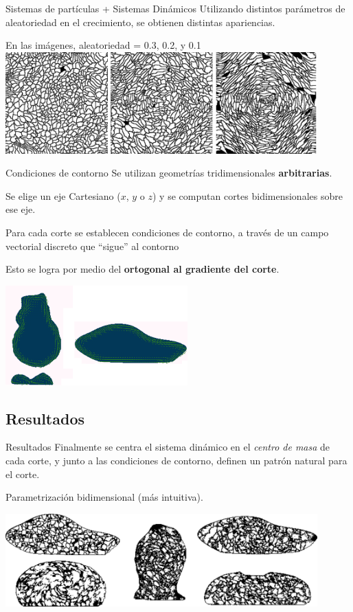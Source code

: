 \documentclass[spanish]{beamer}
\begin{document}
\begin{frame}{Sistemas de partículas + Sistemas Dinámicos}
Utilizando distintos parámetros de aleatoriedad en el crecimiento, se obtienen distintas apariencias.

En las imágenes, aleatoriedad = 0.3, 0.2, y 0.1
  \includegraphics[width=12cm]{../figures/Fig3}
\end{frame}

\begin{frame}{Condiciones de contorno}
Se utilizan geometrías tridimensionales \textbf{arbitrarias}.

Se elige un eje Cartesiano ($x$, $y$ o $z$) y se computan cortes bidimensionales sobre ese eje.

Para cada corte se establecen condiciones de contorno, a través de un campo vectorial discreto que ``sigue'' al contorno

Esto se logra por medio del \textbf{ortogonal al gradiente del corte}.

  \centerline{\includegraphics[width=7cm]{../figures/Fig4}}
\end{frame}

\subsection{Resultados}

\begin{frame}{Resultados}
Finalmente se centra el sistema dinámico en el {\em centro de masa} de cada corte, y junto a las condiciones de contorno, definen un patrón natural para el corte.

Parametrización bidimensional (más intuitiva).

\includegraphics[width=12cm]{../figures/Fig5}
\end{frame}
\end{document}
